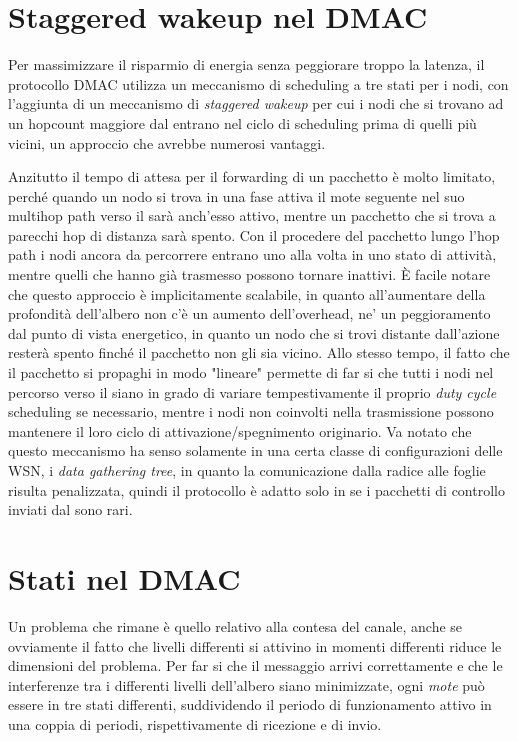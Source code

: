 \documentclass[twoside,11pt,a4paper,italian,openany]{book}
\begin{document}
\section{Staggered wakeup nel DMAC}
Per massimizzare il risparmio di energia senza peggiorare troppo la latenza, 
il protocollo DMAC utilizza un meccanismo di scheduling a tre stati per i nodi, 
con l'aggiunta di un meccanismo di \emph{staggered wakeup} per cui i nodi che si trovano ad un 
hopcount maggiore dal \sink entrano nel ciclo di scheduling prima di quelli più vicini, un 
approccio che avrebbe numerosi vantaggi.

 Anzitutto il tempo di attesa per il forwarding di un
pacchetto è molto limitato, perché quando un nodo si trova in una fase attiva il mote seguente
nel suo multihop path verso il \sink sarà anch'esso attivo, mentre un pacchetto che si trova 
a parecchi hop di distanza sarà spento. 
Con il procedere del pacchetto lungo l'hop path i nodi ancora da percorrere entrano uno alla 
volta in uno stato di attività, mentre quelli che hanno già trasmesso possono tornare inattivi.
\`E facile notare che questo approccio è implicitamente scalabile, in quanto all'aumentare della profondità dell'albero non c'è un aumento dell'overhead, ne' un peggioramento dal punto di vista energetico, in quanto un nodo che si trovi distante dall'azione resterà spento finché il 
pacchetto non gli sia vicino.
Allo stesso tempo, il fatto che il pacchetto si propaghi in modo "lineare" permette di far si 
che tutti i nodi nel percorso verso il \sink siano in grado di variare tempestivamente il 
proprio \emph{duty cycle} scheduling se necessario, mentre i nodi non coinvolti nella trasmissione possono mantenere il loro ciclo di attivazione/spegnimento originario. 
Va notato che questo meccanismo ha senso solamente in una certa classe di configurazioni 
delle WSN, i \emph{data gathering tree}, in quanto la comunicazione dalla radice alle foglie 
risulta penalizzata, quindi il protocollo è adatto solo in se i pacchetti di controllo 
inviati dal \sink sono rari. 

\section{Stati nel DMAC}
Un problema che rimane è quello relativo alla contesa del canale, anche se ovviamente il fatto 
che livelli differenti si attivino in momenti differenti riduce le dimensioni del problema.
Per far si che il messaggio arrivi correttamente e che le interferenze tra i differenti livelli 
dell'albero siano minimizzate, ogni \emph{mote} può essere in tre stati differenti, 
suddividendo il  periodo di funzionamento attivo in una coppia di periodi,
rispettivamente di ricezione e di invio.
\end{document}
